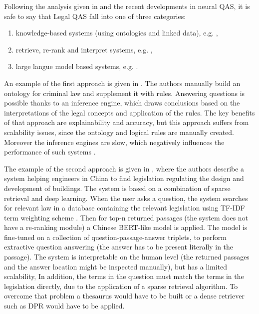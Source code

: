 Following the analysis given in \cite{martinez2023survey} and the recent developments in neural QAS, 
it is safe to say that Legal QAS fall into one of three categories:
\begin{enumerate}
    \item knowledge-based systems (using ontologies and linked data), e.g. \cite{fawei2018methodology, filtz2021linked},
    \item retrieve, re-rank and interpret systems, e.g. \cite{zhong2020building},
    \item large langue model based systems, e.g. \cite{chung2022scaling}.
\end{enumerate}

An example of the first approach is given in \cite{fawei2018methodology}. The authors manually build an ontology
for criminal law and supplement it with rules. Answering questions is possible thanks
to an inference engine, which draws conclusions based on the interpretations of the legal concepts and 
application of the rules. The key benefits of that approach are explainability and accuracy, but this approach
suffers from scalability issues, since the ontology and logical rules are manually created. Moreover 
the inference engines are slow, which negatively influences the performance of such systems \cite{martinez2023survey}.

The example of the second approach is given in \cite{zhong2020building}, where the authors describe a system
helping engineers in China to find legislation regulating the design and development of buildings.
The system is based on a combination of sparse retrieval and deep learning. When the user asks a question,
the system searches for relevant law in a database containing the relevant legislation using TF-IDF term
weighting scheme \cite{manning1999foundations}. Then for top-n returned passages (the system does not have a re-ranking
module) a Chinese BERT-like model is applied. The model is fine-tuned on a collection of question-passage-answer triplets, to 
perform extractive question answering (the answer has to be present literally in the passage). The system is interpretable
on the human level (the returned passages and the answer location might be inspected manually), but has a limited scalability,
In addition, the terms in the question must match the terms in the legislation directly, due to the application of 
a sparse retrieval algorithm. To overcome that problem a thesaurus would have to be built or a dense retriever such as DPR \cite{karpukhin2020dense} would have
to be applied.

